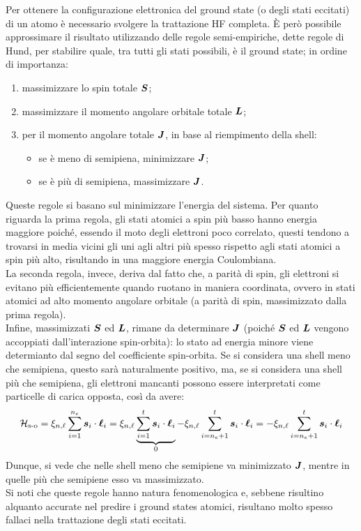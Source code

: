 Per ottenere la configurazione elettronica del ground state (o degli stati eccitati) di un atomo è necessario svolgere la trattazione HF completa. È però possibile approssimare il risultato utilizzando delle regole semi-empiriche, dette regole di Hund, per stabilire quale, tra tutti gli stati possibili\footnotemark, è il ground state; in ordine di importanza:
\begin{enumerate}
	\item massimizzare lo spin totale $ \boldsymbol{S} $;
	\item massimizzare il momento angolare orbitale totale $ \boldsymbol{L} $;
	\item per il momento angolare totale $ \boldsymbol{J} $, in base al riempimento della shell:
		\begin{itemize}
			\item se è meno di semipiena, minimizzare $ \boldsymbol{J} $;
			\item se è più di semipiena, massimizzare $ \boldsymbol{J} $.
		\end{itemize}
\end{enumerate}
Queste regole si basano sul minimizzare l'energia del sistema. Per quanto riguarda la prima regola, gli stati atomici a spin più basso hanno energia maggiore poiché, essendo il moto degli elettroni poco correlato, questi tendono a trovarsi in media vicini gli uni agli altri più spesso rispetto agli stati atomici a spin più alto, risultando in una maggiore energia Coulombiana. \\
La seconda regola, invece, deriva dal fatto che, a parità di spin, gli elettroni si evitano più efficientemente quando ruotano in maniera coordinata, ovvero in stati atomici ad alto momento angolare orbitale (a parità di spin, massimizzato dalla prima regola). \\
Infine, massimizzati $ \boldsymbol{S} $ ed $ \boldsymbol{L} $, rimane da determinare $ \boldsymbol{J} $ (poiché $ \boldsymbol{S} $ ed $ \boldsymbol{L} $ vengono accoppiati dall'interazione spin-orbita): lo stato ad energia minore viene determianto dal segno del coefficiente spin-orbita. Se si considera una shell meno che semipiena, questo sarà naturalmente positivo, ma, se si considera una shell più che semipiena, gli elettroni mancanti possono essere interpretati come particelle di carica opposta, così da avere:
\begin{equation*}
	\mathcal{H}_\text{s-o} = \xi_{n,\ell} \sum_{i = 1}^{n_e} \boldsymbol{s}_i \cdot \boldsymbol{\ell}_i = \xi_{n,\ell} \underbrace{\sum_{i = 1}^{t} \boldsymbol{s}_i \cdot \boldsymbol{\ell}_i}_{0} - \xi_{n,\ell} \sum_{i = n_e+1}^{t} \boldsymbol{s}_i \cdot \boldsymbol{\ell}_i = - \xi_{n,\ell} \sum_{i = n_e + 1}^{t} \boldsymbol{s}_i \cdot \boldsymbol{\ell}_i
\end{equation*}
Dunque, si vede che nelle shell meno che semipiene va minimizzato $ \boldsymbol{J} $, mentre in quelle più che semipiene esso va massimizzato. \\
Si noti che queste regole hanno natura fenomenologica e, sebbene risultino alquanto accurate nel predire i ground states atomici, risultano molto spesso fallaci nella trattazione degli stati eccitati.

